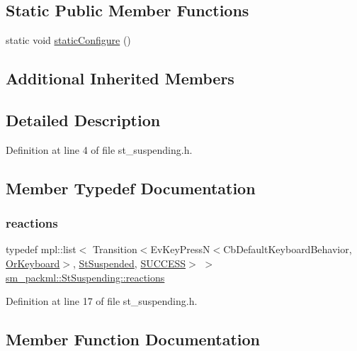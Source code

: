 \subsection*{Static Public Member Functions}
\begin{DoxyCompactItemize}
\item 
static void \hyperlink{structsm__packml_1_1StSuspending_aa8991d63da69d7169fbedc8a55110eef}{static\+Configure} ()
\end{DoxyCompactItemize}
\subsection*{Additional Inherited Members}


\subsection{Detailed Description}


Definition at line 4 of file st\+\_\+suspending.\+h.



\subsection{Member Typedef Documentation}
\mbox{\label{structsm__packml_1_1StSuspending_a0230b8d6ae21587b7537ca0e82d403d3}} 
\subsubsection{\texorpdfstring{reactions}{reactions}}
{\footnotesize\ttfamily typedef mpl\+::list$<$ Transition$<$Ev\+Key\+PressN$<$Cb\+Default\+Keyboard\+Behavior, \hyperlink{classsm__packml_1_1OrKeyboard}{Or\+Keyboard}$>$, \hyperlink{structsm__packml_1_1StSuspended}{St\+Suspended}, \hyperlink{classSUCCESS}{S\+U\+C\+C\+E\+SS}$>$ $>$ \hyperlink{structsm__packml_1_1StSuspending_a0230b8d6ae21587b7537ca0e82d403d3}{sm\+\_\+packml\+::\+St\+Suspending\+::reactions}}



Definition at line 17 of file st\+\_\+suspending.\+h.



\subsection{Member Function Documentation}
\mbox{\label{structsm__packml_1_1StSuspending_a8ba18b18a29151db1297ddfcbd7f9ae7}} 
